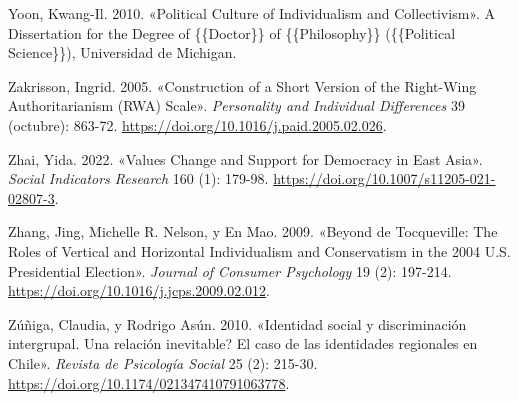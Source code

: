 \documentclass[
  letterpaper,
  DIV=11,
  numbers=noendperiod]{scrartcl}
\newlength{\cslhangindent}
\newenvironment{CSLReferences}[2] %
 {\begin{list}{}{%
  \setlength{\itemindent}{0pt}
  \setlength{\leftmargin}{0pt}
  \setlength{\parsep}{0pt}
  \ifodd #1
   \setlength{\leftmargin}{\cslhangindent}
   \setlength{\itemindent}{-1\cslhangindent}
  \fi
  \setlength{\itemsep}{#2\baselineskip}}}
 {\end{list}}
\begin{document}
\begin{CSLReferences}{1}{0}
Yoon, Kwang-Il. 2010. {«Political {Culture} of {Individualism} and
{Collectivism}»}. A Dissertation for the Degree of \{\{Doctor\}\} of
\{\{Philosophy\}\} (\{\{Political Science\}\}), Universidad de Michigan.

Zakrisson, Ingrid. 2005. {«Construction of a Short Version of the
{Right-Wing Authoritarianism} ({RWA}) {Scale}»}. \emph{Personality and
Individual Differences} 39 (octubre): 863-72.
\url{https://doi.org/10.1016/j.paid.2005.02.026}.

Zhai, Yida. 2022. {«Values {Change} and {Support} for {Democracy} in
{East Asia}»}. \emph{Social Indicators Research} 160 (1): 179-98.
\url{https://doi.org/10.1007/s11205-021-02807-3}.

Zhang, Jing, Michelle R. Nelson, y En Mao. 2009. {«Beyond de
{Tocqueville}: {The} Roles of Vertical and Horizontal Individualism and
Conservatism in the 2004 {U}.{S}. Presidential Election»}. \emph{Journal
of Consumer Psychology} 19 (2): 197-214.
\url{https://doi.org/10.1016/j.jcps.2009.02.012}.

Zúñiga, Claudia, y Rodrigo Asún. 2010. {«{Identidad social y
discriminaci{ó}n intergrupal. {\textquestiondown}Una relaci{ó}n
inevitable? El caso de las identidades regionales en Chile}»}.
\emph{Revista de Psicolog{í}a Social} 25 (2): 215-30.
\url{https://doi.org/10.1174/021347410791063778}.

\end{CSLReferences}
\end{document}
